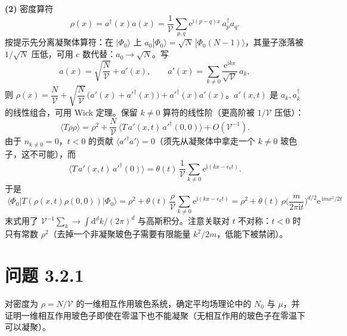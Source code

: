 \textbf{(2)} 密度算符
\begin{equation*}
\rho(x)=a^{\dagger}(x)a(x)=\frac{1}{\mathcal{V}}\sum_{p,q}\mathrm{e}^{\mathrm{i}(p-q)x}\,a_p^{\dagger}a_q .
\end{equation*}
按提示先分离凝聚体算符：在 $|\Phi_0\rangle$ 上 $a_0|\Phi_0\rangle=\sqrt{N}\,|\Phi_0(N-1)\rangle$，其量子涨落被 $1/\sqrt{N}$ 压低，可用 c 数代替：$a_0\to\sqrt{N}$。写
\begin{equation*}
a(x)=\sqrt{\frac{N}{\mathcal{V}}}+a'(x),\qquad
a'(x)=\sum_{k\neq0}\frac{\mathrm{e}^{\mathrm{i}kx}}{\sqrt{\mathcal{V}}}\,a_k ,
\end{equation*}
则 $\rho(x)=\dfrac{N}{\mathcal{V}}+\sqrt{\dfrac{N}{\mathcal{V}}}\,\big(a'(x)+a'^{\dagger}(x)\big)+a'^{\dagger}(x)a'(x)$。$a'(x,t)$ 是 $a_k,a_k^{\dagger}$ 的线性组合，可用 Wick 定理。保留 $k\neq0$ 算符的线性阶（更高阶被 $1/\mathcal{V}$ 压低）：
\begin{equation*}
\langle T\rho\rho\rangle
=\rho^{2}+\frac{N}{\mathcal{V}}\,\langle T\,a'(x,t)\,a'^{\dagger}(0,0)\rangle+O(\mathcal{V}^{-1}) .
\end{equation*}
由于 $n_{k\neq0}=0$，$t<0$ 的贡献 $\langle a'^{\dagger}a'\rangle=0$（须先从凝聚体中拿走一个 $k\neq0$ 玻色子，这不可能），而
\begin{equation*}
\langle T\,a'(x,t)\,a'^{\dagger}(0)\rangle=\theta(t)\,\frac{1}{\mathcal{V}}\sum_{k\neq0}\mathrm{e}^{\mathrm{i}(kx-\epsilon_kt)} .
\end{equation*}
于是
\begin{equation*}
\boxed{\;\langle\Phi_0|T(\rho(x,t)\rho(0,0))|\Phi_0\rangle
=\rho^{2}+\theta(t)\,\frac{\rho}{\mathcal{V}}\sum_{k\neq0}\mathrm{e}^{\mathrm{i}(kx-\epsilon_kt)}
=\rho^{2}+\theta(t)\,\rho\Big(\frac{m}{2\pi\mathrm{i}t}\Big)^{\!d/2}\mathrm{e}^{\,\mathrm{i}mx^{2}/2t}\;}
\end{equation*}
末式用了 $\mathcal{V}^{-1}\sum_k\to\int\mathrm{d}^dk/(2\pi)^d$ 与高斯积分。注意关联对 $t$ 不对称：$t<0$ 时只有常数 $\rho^{2}$（去掉一个非凝聚玻色子需要有限能量 $k^{2}/2m$，低能下被禁闭）。

\section*{问题 3.2.1}
\begin{problem}
对密度为 $\rho=N/\mathcal{V}$ 的一维相互作用玻色系统，确定平均场理论中的 $N_0$ 与 $\mu$，并证明一维相互作用玻色子即使在零温下也不能凝聚（无相互作用的玻色子在零温下可以凝聚）。
\end{problem}
\solution

